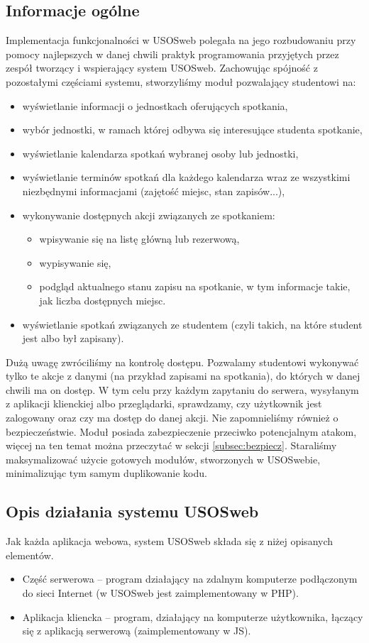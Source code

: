 \documentclass[licencjacka]{pracamgr}
\begin{document}
\subsection{Informacje ogólne}
Implementacja funkcjonalności w USOSweb polegała na jego rozbudowaniu przy pomocy najlepszych w danej chwili praktyk programowania przyjętych przez zespół tworzący i wspierający system USOSweb. Zachowując spójność z pozostałymi częściami systemu, stworzyliśmy moduł pozwalający studentowi na:
\begin{itemize}
  \item{wyświetlanie informacji o jednostkach oferujących spotkania,}
  \item{wybór jednostki, w ramach której odbywa się interesujące studenta spotkanie,}
  \item{wyświetlanie kalendarza spotkań wybranej osoby lub jednostki,}
  \item{wyświetlanie terminów spotkań dla każdego kalendarza wraz ze wszystkimi niezbędnymi informacjami (zajętość miejsc, stan zapisów...),}
  \item{wykonywanie dostępnych akcji związanych ze spotkaniem:
  \begin{itemize}
    \item{wpisywanie się na listę główną lub rezerwową,}
    \item{wypisywanie się,}
    \item{podgląd aktualnego stanu zapisu na spotkanie, w tym informacje takie, jak liczba dostępnych miejsc.}
  \end{itemize}
}
\item{wyświetlanie spotkań związanych ze studentem (czyli takich, na które student jest albo był zapisany).}
\end{itemize}

Dużą uwagę zwróciliśmy na kontrolę dostępu. Pozwalamy studentowi wykonywać tylko te akcje z danymi (na przykład zapisami na spotkania), do których w danej chwili ma on dostęp. W tym celu przy każdym zapytaniu do serwera, wysyłanym z aplikacji klienckiej albo przeglądarki, sprawdzamy, czy użytkownik jest zalogowany oraz czy ma dostęp do danej akcji. Nie zapomnieliśmy również o bezpieczeństwie. Moduł posiada zabezpieczenie przeciwko potencjalnym atakom, więcej na ten temat można przeczytać w sekcji \ref{subsec:bezpiecz}. Staraliśmy maksymalizować użycie gotowych modułów, stworzonych w USOSwebie, minimalizując tym samym duplikowanie kodu.

\subsection{Opis działania systemu USOSweb}
Jak każda aplikacja webowa, system USOSweb składa się z niżej opisanych elementów.
\begin{itemize}
  \item
  Część serwerowa -- program działający na zdalnym komputerze podłączonym do sieci Internet (w USOSweb jest zaimplementowany w PHP).
  \item
  Aplikacja kliencka -- program, działający na komputerze użytkownika, łączący się z aplikacją serwerową (zaimplementowany w JS).
\end{itemize}
\end{document}
